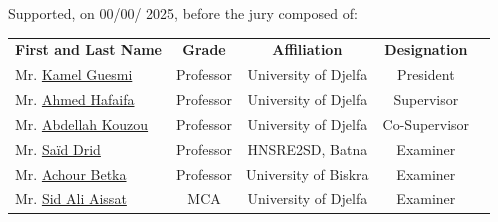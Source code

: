 \begin{titlepage}
	\vspace{0.3cm} 
	\raggedright
	\large Supported, on 00/00/ 2025, before the jury composed of: 
	\begin{table}[h!]
		\centering
		\renewcommand{\arraystretch}{1.5} %
		\setlength{\tabcolsep}{18pt}       %
		\large
		\begin{tabular}{lcccc}
		
			\textbf{First and Last Name}   & \textbf{Grade} & \textbf{Affiliation } & \textbf{Designation } \\ 
		Mr. \href{https://scholar.google.com/citations?user=1U4mT0QAAAAJ&hl=en&oi=sra}{Kamel Guesmi}	   			& Professor & University of Djelfa & President  \\ 
			Mr. \href{https://scholar.google.com/citations?user=AEObM7sAAAAJ&hl=en&oi=ao}{Ahmed Hafaifa }        & Professor & University of Djelfa & Supervisor  \\ 
			Mr. \href{https://scholar.google.com/citations?user=RlqWhskAAAAJ&hl=en&oi=ao}{Abdellah Kouzou}         & Professor & University of Djelfa & Co-Supervisor   \\ 
			Mr. \href{https://scholar.google.com/citations?user=9wTjTXoAAAAJ&hl=en&oi=ao}{Saïd Drid}              & Professor & HNSRE2SD, Batna & Examiner  \\ 
			Mr. \href{https://scholar.google.com/citations?user=EM_k3JoAAAAJ&hl=en&oi=ao}{Achour Betka}           & Professor & University of Biskra & Examiner  \\ 
		    Mr. \href{https://scholar.google.com/citations?user=LLFMgnEAAAAJ&hl=en&oi=ao}{Sid Ali Aissat}        & MCA       & University of Djelfa & Examiner  \\ 
		
		\end{tabular}
		\label{Tab0:jury}
	\end{table}
	
	\vfill %
	
\end{titlepage}
\restoregeometry

